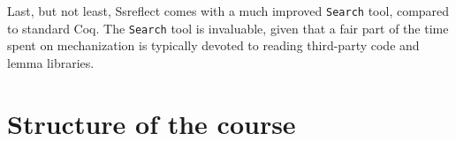\documentclass[blockstyle,preprint,nocopyrightspace]{sigplanconf}
\newcommand{\is}[1]{\textcolor{blue}{(Ilya: {#1})}}
\newcommand{\an}[1]{\textcolor{red}{(Aleks: {#1})}}
\newcommand{\code}[1]{\lstinline{#1}}
\begin{document}

Last, but not least, Ssreflect comes with a much improved
\code{Search} tool, compared to standard Coq. The \code{Search} tool
is invaluable, given that a fair part of the time spent on
mechanization is typically devoted to reading third-party code and
lemma libraries.


%

\section{Structure of the course}
\end{document}
